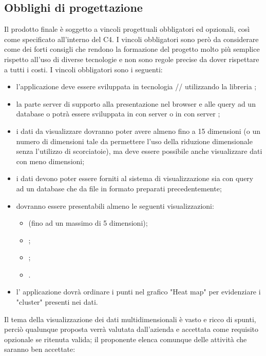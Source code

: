 \subsection{Obblighi di progettazione}
Il prodotto finale è soggetto a vincoli progettuali obbligatori ed opzionali, così come specificato all’interno del  C4. I vincoli obbligatori sono però da considerare come dei forti consigli che rendono la formazione del progetto molto più semplice rispetto all'uso di diverse tecnologie e non sono regole precise da dover rispettare a tutti i costi.
I vincoli obbligatori sono i seguenti:
\begin{itemize}
	\item l'applicazione deve essere sviluppata in tecnologia // utilizzando la libreria ;
	\item la parte server di supporto alla presentazione nel browser e alle query ad un database  o  potrà essere sviluppata in  con server  o in  con server ;
	\item i dati da visualizzare dovranno poter avere almeno fino a 15 dimensioni (o un numero di dimensioni tale da permettere l'uso della riduzione dimensionale senza l'utilizzo di scorciatoie), ma deve essere possibile anche visualizzare dati con meno dimensioni;
	\item i dati devono poter essere forniti al sistema di visualizzazione sia con query ad un database che da file in formato  preparati precedentemente;
	\item dovranno essere presentabili almeno le seguenti visualizzazioni:
	\begin{itemize}
		\item {} (fino ad un massimo di 5 dimensioni);
		\item {};
		\item {};
		\item {}.
	\end{itemize}
	\item l' applicazione dovrà ordinare i punti nel grafico "Heat map" per evidenziare i "cluster" presenti nei dati.
\end{itemize}
Il tema della visualizzazione dei dati multidimensionali è vasto e ricco di spunti, perciò qualunque proposta verrà valutata dall'azienda e accettata come requisito opzionale se ritenuta valida; il proponente elenca comunque delle attività che saranno ben accettate:
